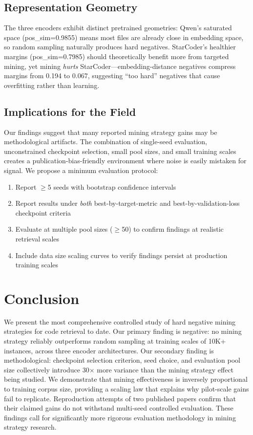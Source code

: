 \documentclass[11pt,a4paper]{article}
\begin{document}
\subsection{Representation Geometry}

The three encoders exhibit distinct pretrained geometries:
Qwen's saturated space (pos\_sim=0.9855) means most files are already close in embedding space, so random sampling naturally produces hard negatives.
StarCoder's healthier margins (pos\_sim=0.7985) should theoretically benefit more from targeted mining, yet mining \textit{hurts} StarCoder---embedding-distance negatives compress margins from 0.194 to 0.067, suggesting ``too hard'' negatives that cause overfitting rather than learning.

\subsection{Implications for the Field}

Our findings suggest that many reported mining strategy gains may be methodological artifacts.
The combination of single-seed evaluation, unconstrained checkpoint selection, small pool sizes, and small training scales creates a publication-bias-friendly environment where noise is easily mistaken for signal.
We propose a minimum evaluation protocol:

\begin{enumerate}
    \item Report $\geq$5 seeds with bootstrap confidence intervals
    \item Report results under \textit{both} best-by-target-metric and best-by-validation-loss checkpoint criteria
    \item Evaluate at multiple pool sizes ($\geq$50) to confirm findings at realistic retrieval scales
    \item Include data size scaling curves to verify findings persist at production training scales
\end{enumerate}

\section{Conclusion}

We present the most comprehensive controlled study of hard negative mining strategies for code retrieval to date.
Our primary finding is negative: no mining strategy reliably outperforms random sampling at training scales of 10K+ instances, across three encoder architectures.
Our secondary finding is methodological: checkpoint selection criterion, seed choice, and evaluation pool size collectively introduce 30$\times$ more variance than the mining strategy effect being studied.
We demonstrate that mining effectiveness is inversely proportional to training corpus size, providing a scaling law that explains why pilot-scale gains fail to replicate.
Reproduction attempts of two published papers confirm that their claimed gains do not withstand multi-seed controlled evaluation.
These findings call for significantly more rigorous evaluation methodology in mining strategy research.
\end{document}
